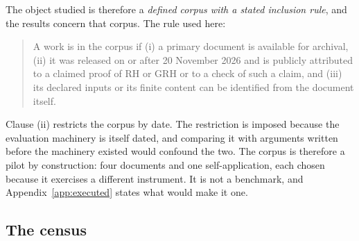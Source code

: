 \documentclass[11pt,a4paper]{article}
\newcommand{\RH}{\mathrm{RH}}
\newcommand{\GRH}{\mathrm{GRH}}
\begin{document}
The object studied is therefore a \emph{defined corpus with a stated inclusion rule}, and
the results concern that corpus. The rule used here:

\begin{quote}
A work is in the corpus if (i) a primary document is available for archival, (ii) it was
released on or after 20 November 2026 and is publicly attributed to a claimed proof of $\RH$ or
$\GRH$ or to a check of such a claim, and (iii) its declared inputs or its finite content can be
identified from the document itself.
\end{quote}

Clause (ii) restricts the corpus by date. The restriction is imposed because the
evaluation machinery is itself dated, and comparing it with arguments written before the machinery
existed would confound the two. The corpus is therefore a pilot by construction: four documents and
one self-application, each chosen because it exercises a different instrument. It is not a
benchmark, and Appendix~\ref{app:executed} states what would make it one.

\subsection{The census}
\end{document}
